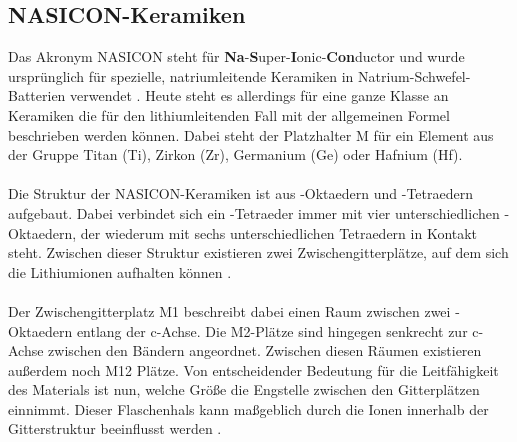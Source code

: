 \documentclass[a4paper, 11pt, headsepline,footsepline,twoside,abstract]{scrbook}
\begin{document}
\subsection{NASICON-Keramiken}
\label{nasicon}
Das Akronym NASICON steht für \textbf{Na}-\textbf{S}uper-\textbf{I}onic-\textbf{Con}ductor und wurde ursprünglich für spezielle, natriumleitende Keramiken in Natrium-Schwefel-Batterien verwendet \cite{hagman1968crystal}. Heute steht es allerdings für eine ganze Klasse an Keramiken die für den lithiumleitenden Fall mit der allgemeinen Formel  beschrieben werden können. Dabei steht der Platzhalter M für ein Element aus der Gruppe Titan (Ti), Zirkon (Zr), Germanium (Ge) oder Hafnium (Hf).
\\\\
Die Struktur der NASICON-Keramiken ist aus -Oktaedern und -Tetraedern aufgebaut. Dabei verbindet sich ein -Tetraeder immer mit vier unterschiedlichen -Oktaedern, der wiederum mit sechs unterschiedlichen Tetraedern in Kontakt steht. Zwischen dieser Struktur existieren zwei Zwischengitterplätze, auf dem sich die Lithiumionen aufhalten können \cite{knauth2009inorganic}.%
\\\\
Der Zwischengitterplatz M1 beschreibt dabei einen Raum zwischen zwei -Oktaedern entlang der c-Achse. Die M2-Plätze sind hingegen senkrecht zur c-Achse zwischen den Bändern angeordnet. Zwischen diesen Räumen existieren außerdem noch M12 Plätze. Von entscheidender Bedeutung für die Leitfähigkeit des Materials ist nun, welche Größe die Engstelle zwischen den Gitterplätzen einnimmt. Dieser Flaschenhals kann maßgeblich durch die Ionen innerhalb der Gitterstruktur beeinflusst werden \cite{cao2014recent}.
\end{document}

